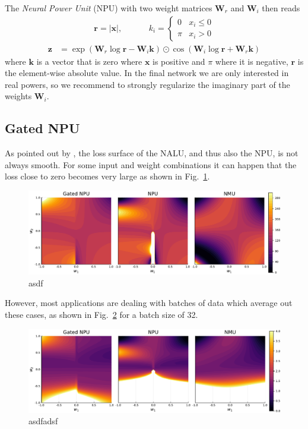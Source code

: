 \documentclass[9pt]{article}
\newcommand{\Wre}{\bm W_{r}}
\newcommand{\Wim}{\bm W_{i}}
\begin{document}
The \emph{Neural Power Unit} (NPU) with two weight matrices $\Wre$ and $\Wim$
then reads
\begin{align}
  \bm r = |\bm x|,
  \hspace{1cm}
  & k_i = \begin{cases}
     0  & x_i \leq 0 \\
    \pi & x_i > 0
  \end{cases}
\end{align}
\begin{align}
  \bm z &= \exp(\Wre \log\bm r - \Wim\bm k) \odot \cos(\Wim\log \bm r + \Wre\bm k)
\end{align}
where $\bm k$ is a vector that is zero where $\bm x$ is positive and $\pi$
where it is negative, $\bm r$ is the element-wise absolute value.
In the final network we are only interested in real powers, so we recommend to
strongly regularize the imaginary part of the weights $\Wim$.

\subsection{Gated NPU}%
\label{sub:gated_npu}
As pointed out by \cite{madsen_neural_2020}, the loss surface of the NALU, and
thus also the NPU, is not always smooth. For some input and weight combinations
it can happen that the loss close to zero becomes very large as shown in
Fig.~\ref{fig:task_loss_npu_nmu}.
\begin{figure}
  \centering
  \includegraphics[width=0.8\linewidth]{task_loss_npu_nmu.pdf}
  \caption{asdf}%
  \label{fig:task_loss_npu_nmu}
\end{figure}
However, most applications are dealing with batches of data which average out
these cases, as shown in Fig.~\ref{fig:task_loss_npu_nmu_average} for a batch
size of 32.
\begin{figure}
  \centering
  \includegraphics[width=0.8\linewidth]{task_loss_npu_nmu_average.pdf}
  \caption{asdfadsf}%
  \label{fig:task_loss_npu_nmu_average}
\end{figure}
\end{document}
